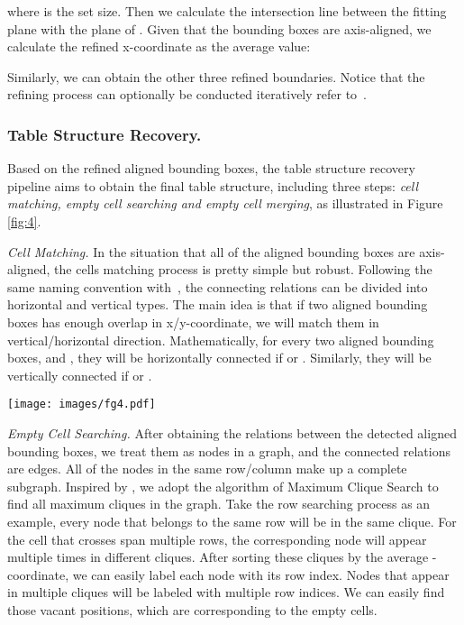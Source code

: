 \documentclass[runningheads]{llncs}
\begin{document}
where  is the set size.
Then we calculate the intersection line between the fitting plane with the plane of . Given that the bounding boxes are axis-aligned, we calculate the refined x-coordinate as the average value:


Similarly, we can obtain the other three refined boundaries. Notice that the refining process can optionally be conducted iteratively refer to~\cite{liu2019pyramid}.
\subsubsection{Table Structure Recovery.}

Based on the refined aligned bounding boxes, the table structure recovery pipeline aims to obtain the final table structure, including three steps: \emph{cell matching, empty cell searching and empty cell merging}, as illustrated in Figure \ref{fig:4}.

\emph{Cell Matching.}
In the situation that all of the aligned bounding boxes are axis-aligned, the cells matching process is pretty simple but robust. Following the same naming convention with~\cite{li2020gfte,chi2019complicated,qasim2019rethinking}, the connecting relations can be divided into horizontal and vertical types.  The main idea is that if two aligned bounding boxes has enough overlap in x/y-coordinate, we will match them in vertical/horizontal direction.  Mathematically, for every two aligned bounding boxes,  and , they will be horizontally connected if  or . Similarly, they will be vertically connected if   or .

\begin{figure*}[t]
\begin{center}
\texttt{[image: images/fg4.pdf]}\\
\end{center}
\caption{The illustration of table structure recovery pipeline.}
\label{fig:4}
\end{figure*}
\emph{Empty Cell Searching. }
After obtaining the relations between the detected aligned bounding boxes, we treat them as nodes in a graph, and the connected relations are edges. All of the nodes in the same row/column make up a complete subgraph. Inspired by \cite{qasim2019rethinking},
we adopt the algorithm of Maximum Clique Search \cite{bron1973algorithm} to find all maximum cliques in the graph. Take the row searching process as an example, every node that belongs to the same row will be in the same clique.
For the cell that crosses span multiple rows, the corresponding node will appear multiple times in different cliques.
After sorting these cliques by the average -coordinate, we can easily label each node with its row index. Nodes that appear in multiple cliques will be labeled with multiple row indices. We can easily find those vacant positions, which are corresponding to the empty cells.
\end{document}
